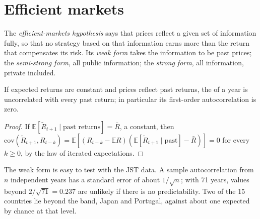 \section{Efficient markets}\label{sec:b2:asset-prices:efficient}

\begin{definition}\label{def:b2:asset-prices:emh}
The \emph{efficient-markets hypothesis} says that prices reflect a
given set of information fully, so that no strategy based on that information earns more than the
return that compensates its risk. Its \emph{weak form} takes the information to be past prices; the
\emph{semi-strong form}, all public information; the \emph{strong form}, all information, private
included.
\end{definition}

\begin{proposition}\label{prop:b2:asset-prices:unpredictable}
If expected returns are constant and prices reflect past returns, the  of a year is
uncorrelated with every past return; in particular its first-order autocorrelation is zero.
\end{proposition}

\begin{proof}
If $\mathbb{E}[\tilde R_{t+1} \mid \text{past returns}] = \bar R$, a constant, then
$\mathrm{cov}(\tilde R_{t+1}, R_{t-k}) = \mathbb{E}[(R_{t-k} - \mathbb{E}R)(\mathbb{E}[\tilde R_{t+1}
\mid \text{past}] - \bar R)] = 0$ for every $k \ge 0$, by the law of iterated expectations.
\end{proof}

The weak form is easy to test with the JST data. A sample autocorrelation from $n$ independent years
has a standard error of about $1/\sqrt n$; with 71 years, values beyond $2/\sqrt{71} = 0.237$ are
unlikely if there is no predictability. Two of the 15 countries lie beyond the band, Japan and
Portugal, against about one expected by chance at that level.

